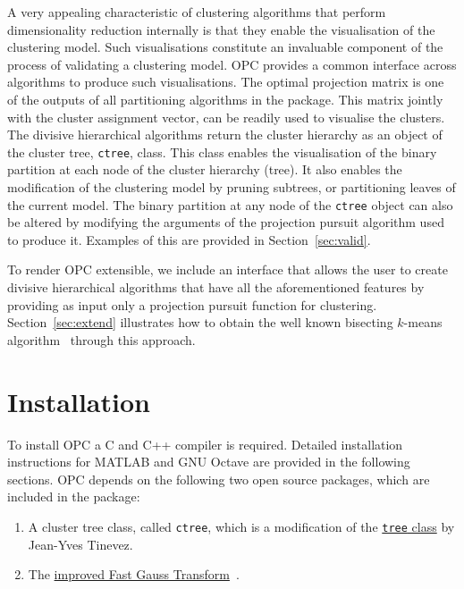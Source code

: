 \documentclass{book}
\begin{document}
A very appealing characteristic of clustering algorithms that perform
dimensionality reduction internally is that they enable the visualisation of
the clustering model. 
%
Such visualisations constitute an invaluable component of the process of
validating a clustering model.  OPC provides a common interface across
algorithms to produce such visualisations.
%
The optimal
projection matrix is one of the outputs of all partitioning algorithms in the
package. This matrix jointly with the cluster assignment vector, can be readily
used to visualise the clusters.
%
The divisive hierarchical algorithms return the cluster hierarchy as an object
of the cluster tree, {\tt ctree}, class.
%
This class enables the visualisation of the binary partition at each
node of the cluster hierarchy (tree). 
%
%
It also enables the modification of the clustering model by pruning subtrees,
or partitioning leaves of the current model.
%
The binary partition at any node of the {\tt ctree} object can also be altered
by modifying the arguments of the projection pursuit algorithm used to produce
it. Examples of this are provided in Section~\ref{sec:valid}.


To render OPC extensible, we include an interface that allows the user to
create divisive hierarchical algorithms that have all the aforementioned
features by providing as input only a projection pursuit function for
clustering. Section~\ref{sec:extend} illustrates how to obtain the well known
bisecting $k$-means algorithm~\cite{SteinbachKK2000} through this approach.



\chapter{Installation}

To install OPC a C and C++ compiler is required. Detailed installation
instructions for MATLAB and GNU Octave are provided in the following sections.
%
OPC depends on the following two open source
packages, which are included in the package:

\begin{enumerate}

\item A cluster tree class, called {\tt ctree}\/, which is a
modification of the
\href{https://uk.mathworks.com/matlabcentral/fileexchange/35623-tree-data-structure-as-a-matlab-class}
{{\tt tree} class} by
Jean-Yves Tinevez.

\item The
\href{http://www.umiacs.umd.edu/~morariu/figtree/}
{improved Fast Gauss Transform}~\cite{Morariu08}.

\end{enumerate}
\end{document}
